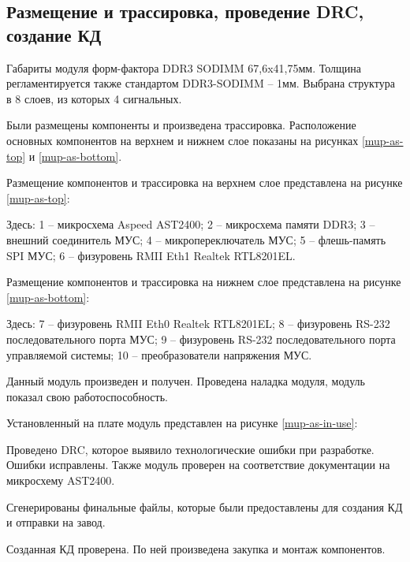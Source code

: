 \subsection{Размещение и трассировка, проведение DRC, создание КД}

Габариты модуля форм-фактора DDR3 SODIMM 67,6x41,75мм. Толщина регламентируется также стандартом DDR3-SODIMM -- 1мм. Выбрана структура в 8 слоев, из которых 4 сигнальных. 

Были размещены компоненты и произведена трассировка. Расположение основных компонентов на верхнем и нижнем слое показаны на рисунках \ref{mup-as-top} и \ref{mup-as-bottom}.

Размещение компонентов и трассировка на верхнем слое представлена на рисунке \ref{mup-as-top}:

Здесь: 1 -- микросхема Aspeed AST2400; 2 -- микросхема памяти DDR3; 3 -- внешний соединитель МУС; 4 -- микропереключатель МУС; 5 -- флешь-память SPI МУС; 6 -- физуровень RMII Eth1 Realtek RTL8201EL. 

Размещение компонентов и трассировка на нижнем слое представлена на рисунке \ref{mup-as-bottom}:

Здесь: 7 -- физуровень RMII Eth0 Realtek RTL8201EL; 8 -- физуровень RS-232 последовательного порта МУС; 9 -- физуровень RS-232 последовательного порта управляемой системы; 10 -- преобразователи напряжения МУС.

Данный модуль произведен и получен. Проведена наладка модуля, модуль показал свою работоспособность.

Установленный на плате модуль представлен на рисунке \ref{mup-as-in-use}:

Проведено DRC, которое выявило технологические ошибки при разработке. Ошибки исправлены. Также модуль проверен на соответствие документации на микросхему AST2400.

Сгенерированы финальные файлы, которые были предоставлены для создания КД и отправки на завод.

Созданная КД проверена. По ней произведена закупка и монтаж компонентов.

\clearpage
